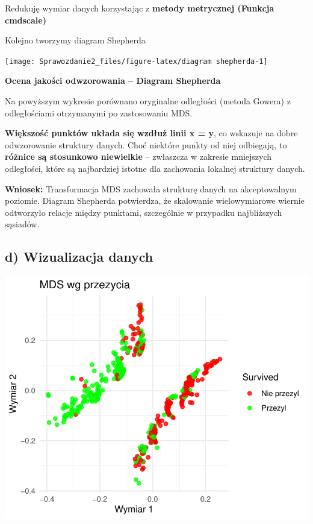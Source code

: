 \documentclass[
  12pt,
]{article}
\begin{document}
Redukuję wymiar danych korzystając z \textbf{metody metrycznej (Funkcja
cmdscale)}

Kolejno tworzymy diagram Shepherda

\begin{center}\texttt{[image: Sprawozdanie2\_files/figure-latex/diagram shepherda-1]} \end{center}

\textbf{Ocena jakości odwzorowania -- Diagram Shepherda}

Na powyższym wykresie porównano oryginalne odległości (metoda Gowera) z
odległościami otrzymanymi po zastosowaniu MDS.

\textbf{Większość punktów układa się wzdłuż linii x = y}, co wskazuje na
dobre odwzorowanie struktury danych. Choć niektóre punkty od niej
odbiegają, to \textbf{różnice są stosunkowo niewielkie} -- zwłaszcza w
zakresie mniejszych odległości, które są najbardziej istotne dla
zachowania lokalnej struktury danych.

\textbf{Wniosek:} Transformacja MDS zachowała strukturę danych na
akceptowalnym poziomie. Diagram Shepherda potwierdza, że skalowanie
wielowymiarowe wiernie odtworzyło relacje między punktami, szczególnie w
przypadku najbliższych sąsiadów.

\subsection{d) Wizualizacja danych}\label{d-wizualizacja-danych}

\begin{center}\includegraphics{Sprawozdanie2_files/figure-latex/rozrzut 2D-1} \end{center}
\end{document}
